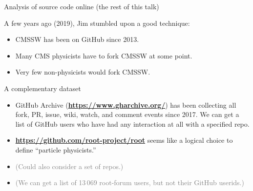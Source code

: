 \documentclass[aspectratio=169]{beamer}
\begin{document}
\begin{frame}{Analysis of source code online (the rest of this talk)}
\vspace{0.5 cm}

A few years ago (2019), Jim stumbled upon a good technique:

\vspace{0.2 cm}
\begin{itemize}
\item CMSSW has been on GitHub since 2013.
\item Many CMS physicists have to fork CMSSW at some point.
\item Very few non-physicists would fork CMSSW.
\end{itemize}

\vspace{0.2 cm}

\vspace{1 cm}
\end{frame}

\begin{frame}{A complementary dataset}
\vspace{0.5 cm}
\vspace{\baselineskip}

\begin{itemize}
\item GitHub Archive (\textcolor{blue}{\small\bf\url{https://www.gharchive.org/}}) has been collecting all fork, PR, issue, wiki, watch, and comment events since 2017. We can get a list of GitHub users who have had any interaction at all with a specified repo.
\item \textcolor{blue}{\small\bf\url{https://github.com/root-project/root}} seems like a logical choice to define ``particle physicists.''
\item \textcolor{gray}{(Could also consider a set of repos.)}
\item \textcolor{gray}{(We can get a list of 13\,069 root-forum users, but not their GitHub userids.)}
\end{itemize}

\vspace{0.2 cm}

\vspace{0.5 cm}
\end{frame}
\end{document}
